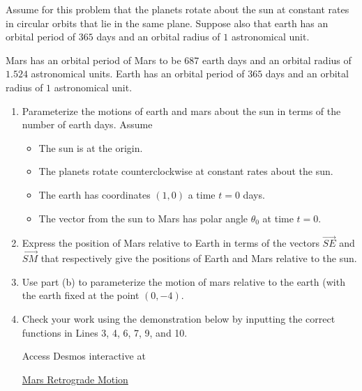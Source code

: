 \documentclass{ximera}
\begin{document}
\begin{exploration}  \label{Eddfsdfd6yhh}
Assume for this problem that the planets rotate about the sun at constant rates in circular orbits that lie in the same plane. Suppose also that earth has an orbital period of $365$ days and an orbital radius of $1$ astronomical unit.


Mars has an orbital period of Mars to be 687 earth days and an orbital radius of $1.524$ astronomical units. Earth has an orbital period of $365$ days and an orbital radius of $1$ astronomical unit.

\begin{enumerate}

\item Parameterize the motions of earth and mars about the sun in terms of the number of earth days. Assume

\begin{itemize}

\item{The sun is at the origin.}

\item{The planets rotate counterclockwise at constant rates about the sun.} 

\item{The earth has coordinates $(1,0)$ a time $t=0$ days.}

\item{The vector from the sun to Mars has polar angle $\theta_0$ at time $t=0$.}

\end{itemize}

\item Express the position of Mars relative to Earth in terms of the vectors $\overrightarrow{SE}$ and $\overrightarrow{SM}$
that respectively give the positions of Earth and Mars relative to the sun.


\item Use part (b)  to parameterize the motion of mars relative to the earth (with the earth  fixed at the point $(0,-4)$.


\item Check your work using the demonstration below by inputting the correct functions in Lines 3, 4, 6, 7, 9, and 10.

Access Desmos interactive at
 
\href{https://www.desmos.com/calculator/htc4xgrjxs}{Mars Retrograde Motion}

 
\begin{onlineOnly}
    \begin{center}
\end{center}
\end{onlineOnly}


\end{enumerate}
\end{exploration}
\end{document}
